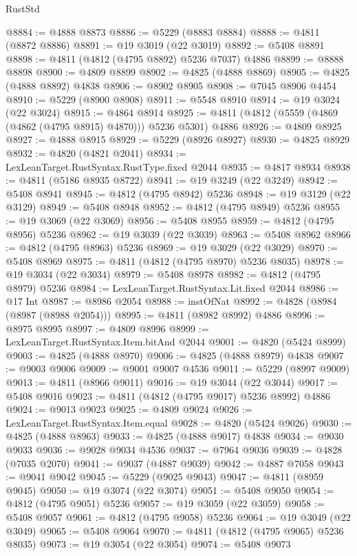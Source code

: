 \begin{lexlean}{RustStd}
\begin{coremodule}
@8884 := @4888 @8873
@8886 := @5229 (@8883 @8884)
@8888 := @4811 (@8872 @8886)
@8891 := @19 @3019 (@22 @3019)
@8892 := @5408 @8891
@8898 := @4811 (@4812 (@4795 @8892) @5236 @7037) @4886
@8899 := @8888 @8898
@8900 := @4809 @8899
@8902 := @4825 (@4888 @8869)
@8905 := @4825 (@4888 @8892) @4838
@8906 := @8902 @8905
@8908 := @7045 @8906 @4454
@8910 := @5229 (@8900 @8908)
@8911 := @5548 @8910
@8914 := @19 @3024 (@22 @3024)
@8915 := @4864 @8914
@8925 := @4811 (@4812 (@5559 (@4869 (@4862 (@4795 @8915) @4870))) @5236 @5301) @4886
@8926 := @4809 @8925
@8927 := @4888 @8915
@8929 := @5229 (@8926 @8927)
@8930 := @4825 @8929
@8932 := @4820 (@4821 @2041)
@8934 := LexLeanTarget.RustSyntax.RustType.fixed @2044
@8935 := @4817 @8934
@8938 := @4811 (@5186 @8935 @8722)
@8941 := @19 @3249 (@22 @3249)
@8942 := @5408 @8941
@8945 := @4812 (@4795 @8942) @5236
@8948 := @19 @3129 (@22 @3129)
@8949 := @5408 @8948
@8952 := @4812 (@4795 @8949) @5236
@8955 := @19 @3069 (@22 @3069)
@8956 := @5408 @8955
@8959 := @4812 (@4795 @8956) @5236
@8962 := @19 @3039 (@22 @3039)
@8963 := @5408 @8962
@8966 := @4812 (@4795 @8963) @5236
@8969 := @19 @3029 (@22 @3029)
@8970 := @5408 @8969
@8975 := @4811 (@4812 (@4795 @8970) @5236 @8035)
@8978 := @19 @3034 (@22 @3034)
@8979 := @5408 @8978
@8982 := @4812 (@4795 @8979) @5236
@8984 := LexLeanTarget.RustSyntax.Lit.fixed @2044
@8986 := @17 Int
@8987 := @8986 @2054
@8988 := instOfNat
@8992 := @4828 (@8984 (@8987 (@8988 @2054)))
@8995 := @4811 (@8982 @8992) @4886
@8996 := @8975 @8995
@8997 := @4809 @8996
@8999 := LexLeanTarget.RustSyntax.Item.bitAnd @2044
@9001 := @4820 (@5424 @8999)
@9003 := @4825 (@4888 @8970)
@9006 := @4825 (@4888 @8979) @4838
@9007 := @9003 @9006
@9009 := @9001 @9007 @4536
@9011 := @5229 (@8997 @9009)
@9013 := @4811 (@8966 @9011)
@9016 := @19 @3044 (@22 @3044)
@9017 := @5408 @9016
@9023 := @4811 (@4812 (@4795 @9017) @5236 @8992) @4886
@9024 := @9013 @9023
@9025 := @4809 @9024
@9026 := LexLeanTarget.RustSyntax.Item.equal
@9028 := @4820 (@5424 @9026)
@9030 := @4825 (@4888 @8963)
@9033 := @4825 (@4888 @9017) @4838
@9034 := @9030 @9033
@9036 := @9028 @9034 @4536
@9037 := @7964 @9036
@9039 := @4828 (@7035 @2070)
@9041 := @9037 (@4887 @9039)
@9042 := @4887 @7058
@9043 := @9041 @9042
@9045 := @5229 (@9025 @9043)
@9047 := @4811 (@8959 @9045)
@9050 := @19 @3074 (@22 @3074)
@9051 := @5408 @9050
@9054 := @4812 (@4795 @9051) @5236
@9057 := @19 @3059 (@22 @3059)
@9058 := @5408 @9057
@9061 := @4812 (@4795 @9058) @5236
@9064 := @19 @3049 (@22 @3049)
@9065 := @5408 @9064
@9070 := @4811 (@4812 (@4795 @9065) @5236 @8035)
@9073 := @19 @3054 (@22 @3054)
@9074 := @5408 @9073

\end{coremodule}
\end{lexlean}
